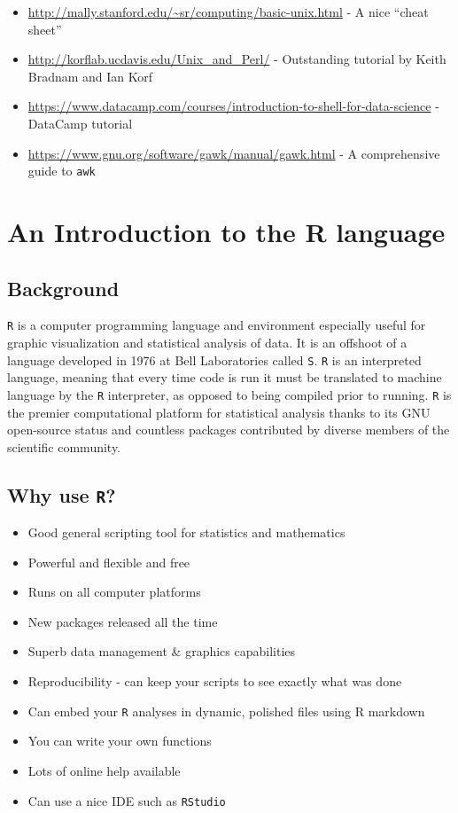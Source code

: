 \documentclass[
]{book}
\providecommand{\tightlist}{%
  \setlength{\itemsep}{0pt}\setlength{\parskip}{0pt}}
\begin{document}
\begin{itemize}
\item
  \url{http://mally.stanford.edu/~sr/computing/basic-unix.html} - A nice ``cheat sheet''
\item
  \url{http://korflab.ucdavis.edu/Unix_and_Perl/} - Outstanding tutorial by Keith Bradnam and Ian Korf
\item
  \url{https://www.datacamp.com/courses/introduction-to-shell-for-data-science} - DataCamp tutorial
\item
  \url{https://www.gnu.org/software/gawk/manual/gawk.html} - A comprehensive guide to \texttt{awk}
\end{itemize}

\hypertarget{an-introduction-to-the-r-language}{%
\chapter{An Introduction to the R language}\label{an-introduction-to-the-r-language}}

\hypertarget{background}{%
\section{Background}\label{background}}

\texttt{R} is a computer programming language and environment especially useful for graphic visualization and statistical analysis of data. It is an offshoot of a language developed in 1976 at Bell Laboratories called \texttt{S}. \texttt{R} is an interpreted language, meaning that every time code is run it must be translated to machine language by the \texttt{R} interpreter, as opposed to being compiled prior to running. \texttt{R} is the premier computational platform for statistical analysis thanks to its GNU open-source status and countless packages contributed by diverse members of the scientific community.

\hypertarget{why-use-r}{%
\section{\texorpdfstring{Why use \texttt{R}?}{Why use R?}}\label{why-use-r}}

\begin{itemize}
\tightlist
\item
  Good general scripting tool for statistics and mathematics
\item
  Powerful and flexible and free
\item
  Runs on all computer platforms
\item
  New packages released all the time
\item
  Superb data management \& graphics capabilities
\item
  Reproducibility - can keep your scripts to see exactly what was done
\item
  Can embed your \texttt{R} analyses in dynamic, polished files using R markdown
\item
  You can write your own functions
\item
  Lots of online help available
\item
  Can use a nice IDE such as \texttt{RStudio}
\end{itemize}
\end{document}
